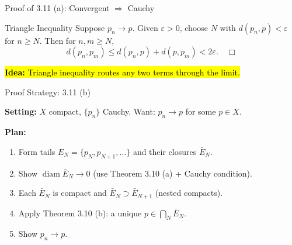 \documentclass[aspectratio=169,12pt,t]{beamer}
\begin{document}
{%
\begin{frame}{Proof of 3.11 (a): Convergent $\Rightarrow$ Cauchy}
  \begin{proofblock}{Triangle Inequality}
    Suppose $p_n \to p$. Given $\varepsilon > 0$, choose $N$ with $d(p_n, p) < \varepsilon$ for $n \geq N$. Then for $n, m \geq N$,
    \[
      d(p_n, p_m) \leq d(p_n, p) + d(p, p_m) < 2\varepsilon. \quad \Box
    \]
  \end{proofblock}

  \vspace{0.4em}
  \hl{\textbf{Idea:} Triangle inequality routes any two terms through the limit.}

\end{frame}

\begin{frame}{Proof Strategy: 3.11 (b)}
  \begin{hlbox}
    \textbf{Setting:} $X$ compact, $\{p_n\}$ Cauchy. Want: $p_n \to p$ for some $p \in X$.

    \vspace{0.5em}
    \textbf{Plan:}
    \begin{enumerate}
      \item Form tails $E_N = \{p_N, p_{N+1}, \ldots\}$ and their closures $\bar{E}_N$.
      \item Show $\operatorname{diam} \bar{E}_N \to 0$ (use Theorem 3.10 (a) + Cauchy condition).
      \item Each $\bar{E}_N$ is compact and $\bar{E}_N \supset \bar{E}_{N+1}$ (nested compacts).
      \item Apply Theorem 3.10 (b): a unique $p \in \bigcap_N \bar{E}_N$.
      \item Show $p_n \to p$.
    \end{enumerate}
  \end{hlbox}


\end{frame}}
\end{document}
